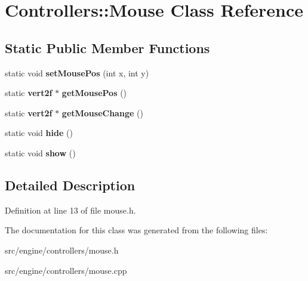 \section{Controllers\+:\+:Mouse Class Reference}
\label{class_controllers_1_1_mouse}
\subsection*{Static Public Member Functions}
\begin{DoxyCompactItemize}
\item 
\mbox{\label{class_controllers_1_1_mouse_a8d3284b6f13f476fbbde922c5d6baf07}} 
static void {\bfseries set\+Mouse\+Pos} (int x, int y)
\item 
\mbox{\label{class_controllers_1_1_mouse_a6e60438b83b7b4190c98c9e72b8ae8cd}} 
static \textbf{ vert2f} $\ast$ {\bfseries get\+Mouse\+Pos} ()
\item 
\mbox{\label{class_controllers_1_1_mouse_a86e6a035e84791e868a4a3fc354e5885}} 
static \textbf{ vert2f} $\ast$ {\bfseries get\+Mouse\+Change} ()
\item 
\mbox{\label{class_controllers_1_1_mouse_a51cbcf499b9cf31ace1acf7945ca104d}} 
static void {\bfseries hide} ()
\item 
\mbox{\label{class_controllers_1_1_mouse_aa5db31c31460341b47081f4f742a382a}} 
static void {\bfseries show} ()
\end{DoxyCompactItemize}


\subsection{Detailed Description}


Definition at line 13 of file mouse.\+h.



The documentation for this class was generated from the following files\+:\begin{DoxyCompactItemize}
\item 
src/engine/controllers/mouse.\+h\item 
src/engine/controllers/mouse.\+cpp\end{DoxyCompactItemize}
